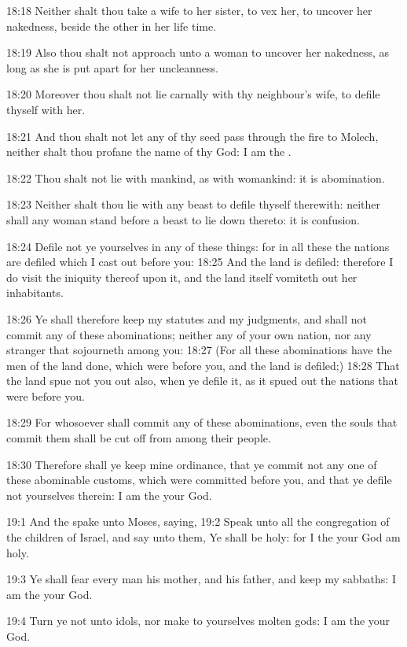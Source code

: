 18:18 Neither shalt thou take a wife to her sister, to vex her, to uncover her nakedness, beside the other in her life time.

18:19 Also thou shalt not approach unto a woman to uncover her nakedness, as long as she is put apart for her uncleanness.

18:20 Moreover thou shalt not lie carnally with thy neighbour's wife, to defile thyself with her.

18:21 And thou shalt not let any of thy seed pass through the fire to Molech, neither shalt thou profane the name of thy God: I am the \LORD.

18:22 Thou shalt not lie with mankind, as with womankind: it is abomination.

18:23 Neither shalt thou lie with any beast to defile thyself therewith: neither shall any woman stand before a beast to lie down thereto: it is confusion.

18:24 Defile not ye yourselves in any of these things: for in all these the nations are defiled which I cast out before you: 18:25 And the land is defiled: therefore I do visit the iniquity thereof upon it, and the land itself vomiteth out her inhabitants.

18:26 Ye shall therefore keep my statutes and my judgments, and shall not commit any of these abominations; neither any of your own nation, nor any stranger that sojourneth among you: 18:27 (For all these abominations have the men of the land done, which were before you, and the land is defiled;) 18:28 That the land spue not you out also, when ye defile it, as it spued out the nations that were before you.

18:29 For whosoever shall commit any of these abominations, even the souls that commit them shall be cut off from among their people.

18:30 Therefore shall ye keep mine ordinance, that ye commit not any one of these abominable customs, which were committed before you, and that ye defile not yourselves therein: I am the \LORD your God.

19:1 And the \LORD spake unto Moses, saying, 19:2 Speak unto all the congregation of the children of Israel, and say unto them, Ye shall be holy: for I the \LORD your God am holy.

19:3 Ye shall fear every man his mother, and his father, and keep my sabbaths: I am the \LORD your God.

19:4 Turn ye not unto idols, nor make to yourselves molten gods: I am the \LORD your God.

